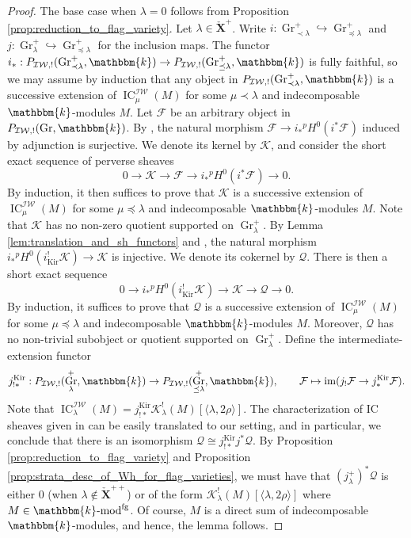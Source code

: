 \documentclass{amsart}
\renewcommand{\k}{\mathbbm{k}}
\newcommand{\scrF}{\mathcal{F}}
\newcommand{\scrK}{\mathcal{K}}
\newcommand{\bfXv}{\check{\mathbf{X}}}
\newcommand{\IW}{\mathcal{IW}}
\DeclareMathOperator{\im}{im}
\renewcommand{\mod}[1]{#1\textnormal{-mod}}
\DeclareMathOperator{\IC}{IC}
\newcommand{\scrQ}{\mathcal{Q}}
\DeclareMathOperator{\Gr}{Gr}
\DeclareMathOperator{\fg}{fg}
\DeclareMathOperator{\Kir}{Kir}
\theoremstyle{definition}
\begin{document}
\begin{proof}
        The base case when $\lambda = 0$ follows from Proposition \ref{prop:reduction_to_flag_variety}.
        Let $\lambda \in \bfXv^+$. Write $i : \Gr_{\prec \lambda}^+ \hookrightarrow \Gr_{\preceq \lambda}^+$ and $j : \Gr_{\lambda}^+ \hookrightarrow \Gr_{\preceq \lambda}^+$ for the inclusion maps.
        The functor $i_* : P_{\IW, !} (\Gr_{\prec \lambda}^+, \k) \to P_{\IW, !} (\Gr_{\preceq \lambda}^+, \k)$ is fully faithful, so we may assume by induction that any object in $P_{\IW, !} (\Gr_{\prec \lambda}^+, \k)$ is a successive extension of $\IC_{\mu}^{\IW} (M)$ for some $\mu \prec \lambda$ and indecomposable $\k$-modules $M$.
        Let $\scrF$ be an arbitrary object in $P_{\IW, !} (\Gr, \k)$.
       By \cite[Proposition 1.4.17 (ii)]{BBD}, the natural morphism $\scrF \to i_* {}^p H^0 (i^* \scrF)$ induced by adjunction is surjective. We denote its kernel by $\scrK$, and consider the short exact sequence of perverse sheaves
       \[0 \to \scrK \to \scrF \to i_* {}^p H^0 (i^* \scrF) \to 0.\]
       By induction, it then suffices to prove that $\scrK$ is a successive extension of $\IC_{\mu}^{\IW} (M)$ for some $\mu \preceq \lambda$ and indecomposable $\k$-modules $M$.
       Note that $\scrK$ has no non-zero quotient supported on $\Gr_{\lambda}^+$. By Lemma \ref{lem:translation_and_sh_functors} and \cite[Proposition 1.4.17 (ii)]{BBD}, the natural morphism $i_* {}^p H^0 (i_{\Kir}^! \scrK) \to \scrK$ is injective. We denote its cokernel by $\scrQ$.
       There is then a short exact sequence
       \[0 \to i_* {}^p H^0 (i_{\Kir}^! \scrK) \to \scrK \to \scrQ \to 0.\]
       By induction, it suffices to prove that $\scrQ$ is a successive extension of $\IC_{\mu}^{\IW} (M)$ for some $\mu \preceq \lambda$ and indecomposable $\k$-modules $M$.
       Moreover, $\scrQ$ has no non-trivial subobject or quotient supported on $\Gr_{\lambda}^+$. 
       Define the intermediate-extension functor
       \[j_{!*}^{\Kir} : P_{\IW, !} (\Gr_{\lambda}^+, \k) \to P_{\IW, !} (\Gr_{\preceq \lambda}^+, \k), \qquad \scrF \mapsto \im (j_! \scrF \to j_*^{\Kir} \scrF).\]
       Note that $\IC_{\lambda}^{\IW} (M) = j_{!*}^{\Kir} \scrK_{\lambda}^! (M) [\langle \lambda, 2\rho \rangle]$.
       The characterization of IC sheaves given in \cite[Corollaire 1.4.25]{BBD} can be easily translated to our setting, and in particular, we conclude that there is an isomorphism $\scrQ \cong j_{!*}^{\Kir} j^* \scrQ$. 
       By Proposition \ref{prop:reduction_to_flag_variety} and Proposition \ref{prop:strata_desc_of_Wh_for_flag_varieties}, we must have that $(j_{\lambda}^+)^* \scrQ$ is either 0 (when $\lambda \notin \bfXv^{++}$) or of the form $\scrK_{\lambda}^! (M) [\langle \lambda, 2\rho \rangle]$ where $M \in \mod{\k}^{\fg}$.
       Of course, $M$ is a direct sum of indecomposable $\k$-modules, and hence, the lemma follows.
    \end{proof}
\end{document}
